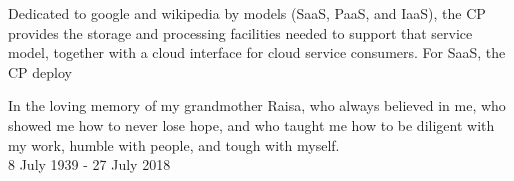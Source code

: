 \documentclass[print]{nuthesis}
\begin{document}
\begin{my_dedication}
Dedicated to google and wikipedia by models (SaaS, PaaS, and IaaS), the CP provides the storage and processing facilities
needed to support that service model, together with a cloud interface for cloud
service consumers. For SaaS, the CP deploy
\end{my_dedication}
\fi

\begin{dedication}
  { { %
  In the loving memory of my grandmother Raisa, who always believed in me,   
  who showed me how to never lose hope, and  who taught me 
  how to be diligent with my work,  humble with people, and tough with myself.
}}\\{\footnotesize 8 July 1939 - 27 July 2018}\\ \ \\
  \vspace{4cm}
\end{dedication}






\begin{acknowledgments}
\end{acknowledgments}


\tableofcontents*

\listoffigures
\listoftables
\mainmatter
\end{document}
